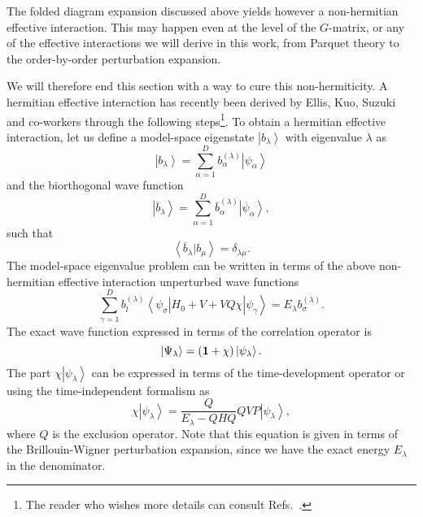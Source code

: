 The folded diagram expansion discussed above yields however
a non-hermitian effective interaction. This may happen even at the 
level of the $G$-matrix, or any of the effective interactions
we will derive in this work, from Parquet theory to
the order-by-order perturbation expansion.

We will therefore end this section with a way to cure
this non-hermiticity. 
A hermitian effective interaction has recently been derived by 
Ellis, Kuo, Suzuki and co-workers \cite{so95,so84,kehlsok93} through the
following steps\footnote{The reader who wishes more details can consult
Refs.\ \cite{so95,kehlsok93}.}.  
To obtain a hermitian effective interaction, 
let us define 
a model-space eigenstate
$\left | b_{\lambda}\right\rangle$ with eigenvalue $\lambda$ as
\begin{equation}
     \left | b_{\lambda}\right\rangle=\sum_{\alpha =1}^{D}
     b_{\alpha}^{(\lambda )}\left | \psi_{\alpha}\right\rangle
\end{equation}
and the biorthogonal wave function
\begin{equation}
     \left | \overline{b}_{\lambda}\right\rangle=\sum_{\alpha=1}^{D}
      \overline{b}_{\alpha}^{(\lambda )}
     \left | \overline{\psi}_{\alpha}\right\rangle,
\end{equation}
such that
\begin{equation}
     {\left\langle \overline{b}_{\lambda} | b_{\mu} \right\rangle}=
     \delta_{\lambda\mu}.
\end{equation}
The model-space eigenvalue problem can be written 
in terms of the above non-hermitian effective interaction unperturbed
wave functions
\begin{equation}
     {\displaystyle
     \sum_{\gamma =1}^{D}b_l^{(\lambda )}\left\langle \psi_{\sigma}\right |
     H_0+V+VQ\chi\left | \psi_{\gamma}\right\rangle}  =
     E_{\lambda}b_{\sigma}^{(\lambda )}.
\end{equation}
The exact wave function expressed in terms of the correlation 
operator is
\begin{equation}
      \left | \Psi_{\lambda}\right\rangle=
      ({\bf 1}+\chi)\left | \psi_{\lambda}\right\rangle.
\end{equation}
The part $\chi\left | \psi_{\lambda}\right\rangle$ can be expressed in terms
of the time-development operator or 
using the time-independent formalism as
\begin{equation}
  \chi\left | \psi_{\lambda}\right\rangle=
  \frac{Q}{E_{\lambda}-QHQ}QVP\left | \psi_{\lambda}\right\rangle,
  \label{eq:newchi}
\end{equation}
where $Q$ is the exclusion operator. Note that this equation is given
in terms of the Brillouin-Wigner perturbation expansion, since
we have the exact energy $E_{\lambda}$ in the denominator.

